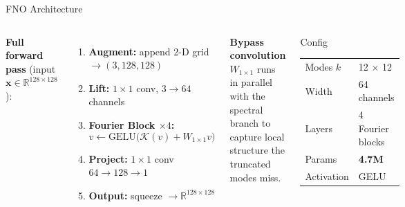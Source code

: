 \documentclass[aspectratio=169, 11pt]{beamer}
\begin{document}
\begin{frame}{FNO Architecture}
  \begin{columns}[t]
      \textbf{Full forward pass} (input $\mathbf{x}\in\mathbb{R}^{128\times128}$):
      \begin{enumerate}\small
        \item \textbf{Augment:} append 2-D grid $\to (3, 128, 128)$
        \item \textbf{Lift:} $1\times1$ conv, $3\to64$ channels
        \item \textbf{Fourier Block $\times4$:}
              \[v \leftarrow \text{GELU}\!\bigl(\mathcal{K}(v) + W_{1\times1}v\bigr)\]
        \item \textbf{Project:} $1\times1$ conv $64\to128\to1$
        \item \textbf{Output:} squeeze $\to\mathbb{R}^{128\times128}$
      \end{enumerate}
      \vspace{0.3em}
      \textbf{Bypass convolution} $W_{1\times1}$ runs in parallel with the spectral
      branch to capture local structure the truncated modes miss.

      \begin{block}{Config}
        \begin{tabular}{ll}
          Modes $k$ & 12 $\times$ 12 \\
          Width     & 64 channels \\
          Layers    & 4 Fourier blocks \\
          Params    & \textbf{4.7M} \\
          Activation & GELU \\
        \end{tabular}
      \end{block}
  \end{columns}
\end{frame}
\end{document}
